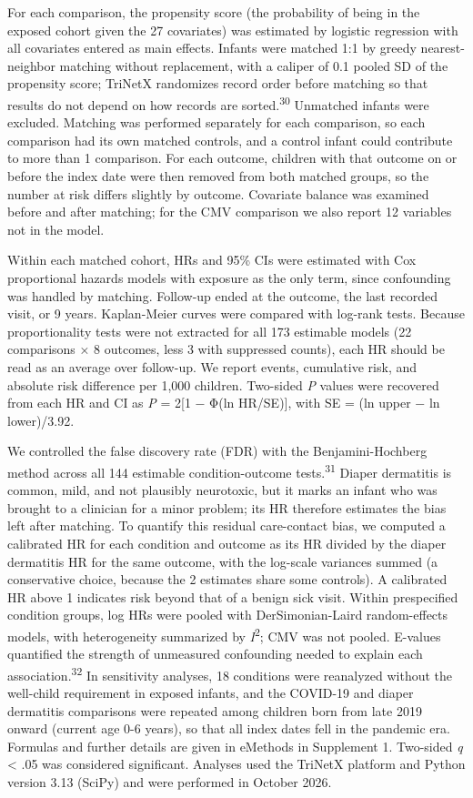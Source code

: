 \documentclass[11pt]{article}
\begin{document}
For each comparison, the propensity score (the probability of being in the exposed cohort given the 27 covariates) was estimated by logistic regression with all covariates entered as main effects.
Infants were matched 1:1 by greedy nearest-neighbor matching without replacement, with a caliper of 0.1 pooled SD of the propensity score; TriNetX randomizes record order before matching so that
results do not depend on how records are sorted.\textsuperscript{30} Unmatched infants were excluded. Matching was performed separately for each comparison, so each comparison had its own matched
controls, and a control infant could contribute to more than 1 comparison. For each outcome, children with that outcome on or before the index date were then removed from both matched groups, so the
number at risk differs slightly by outcome. Covariate balance was examined before and after matching; for the CMV comparison we also report 12 variables not in the model.

Within each matched cohort, HRs and 95\% CIs were estimated with Cox proportional hazards models with exposure as the only term, since confounding was handled by matching. Follow-up ended at the
outcome, the last recorded visit, or 9 years. Kaplan-Meier curves were compared with log-rank tests. Because proportionality tests were not extracted for all 173 estimable models (22 comparisons × 8
outcomes, less 3 with suppressed counts), each HR should be read as an average over follow-up. We report events, cumulative risk, and absolute risk difference per 1,000 children. Two-sided \emph{P}
values were recovered from each HR and CI as \emph{P} = 2{[}1 − Φ(\textbar ln HR\textbar/SE){]}, with SE = (ln upper − ln lower)/3.92.

We controlled the false discovery rate (FDR) with the Benjamini-Hochberg method across all 144 estimable condition-outcome tests.\textsuperscript{31} Diaper dermatitis is common, mild, and not
plausibly neurotoxic, but it marks an infant who was brought to a clinician for a minor problem; its HR therefore estimates the bias left after matching. To quantify this residual care-contact bias,
we computed a calibrated HR for each condition and outcome as its HR divided by the diaper dermatitis HR for the same outcome, with the log-scale variances summed (a conservative choice, because the 2
estimates share some controls). A calibrated HR above 1 indicates risk beyond that of a benign sick visit. Within prespecified condition groups, log HRs were pooled with DerSimonian-Laird
random-effects models, with heterogeneity summarized by \emph{I}\textsuperscript{2}; CMV was not pooled. E-values quantified the strength of unmeasured confounding needed to explain each
association.\textsuperscript{32} In sensitivity analyses, 18 conditions were reanalyzed without the well-child requirement in exposed infants, and the COVID-19 and diaper dermatitis comparisons were
repeated among children born from late 2019 onward (current age 0-6 years), so that all index dates fell in the pandemic era. Formulas and further details are given in eMethods in Supplement 1.
Two-sided \emph{q} \textless{} .05 was considered significant. Analyses used the TriNetX platform and Python version 3.13 (SciPy) and were performed in October 2026.
\end{document}
